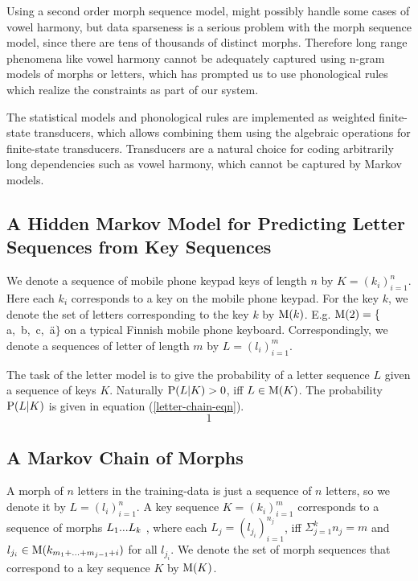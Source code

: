 \documentclass{llncs}
\begin{document}
Using a second order morph sequence model, might possibly handle some
cases of vowel harmony, but data sparseness is a serious problem with
the morph sequence model, since there are tens of thousands of
distinct morphs. Therefore long range phenomena like vowel harmony
cannot be adequately captured using n-gram models of morphs or
letters, which has prompted us to use phonological rules which realize
the constraints as part of our system.

The statistical models and phonological rules are implemented as
weighted finite-state transducers, which allows combining them using
the algebraic operations for finite-state transducers. Transducers are
a natural choice for coding arbitrarily long dependencies such as
vowel harmony, which cannot be captured by Markov models.

\subsection{A Hidden Markov Model for Predicting Letter Sequences from Key Sequences}

We denote a sequence of mobile phone keypad keys of length $n$ by $K =
(k_i)_{i=1}^{n}$. Here each $k_i$ corresponds to a key on the mobile
phone keypad. For the key $k$, we denote the set of letters
corresponding to the key $k$ by ${\rm M}(k)$. E.g. ${\rm M}(2) =
\{$a,~b,~c,~\"{a}$\}$ on a typical Finnish mobile phone
keyboard. Correspondingly, we denote a sequences of letter of length
$m$ by $L = (l_i)_{i=1}^{m}$.

The task of the letter model is to give the probability of a letter
sequence $L$ given a sequence of keys $K$. Naturally ${\rm P}(L|K) > 0$, iff
$L \in {\rm M}(K)$. The probability ${\rm P}(L|K)$ is given in equation (\ref{letter-chain-eqn}).  
\begin{equation}\label{letter-chain-eqn}
1
\end{equation}

\subsection{A Markov Chain of Morphs}

A morph of $n$ letters in the training-data is just a sequence of $n$
letters, so we denote it by $L = (l_i)_{i=1}^{n}$. A key sequence $K =
(k_i)_{i=1}^{m}$ corresponds to a sequence of morphs $L_1{\rm
  ... }L_k$ , where each $L_j = (l_{j_i})_{i=1}^{n_j}$, iff $\Sigma_{j
  = 1}^{k} n_j = m$ and $l_{j_i} \in {\rm M}(k_{m_1 + {\rm ... } +
  m_{j - 1} + i})$ for all $l_{j_i}$. We denote the set of morph
sequences that correspond to a key sequence $K$ by ${\rm M}(K)$.
\end{document}
